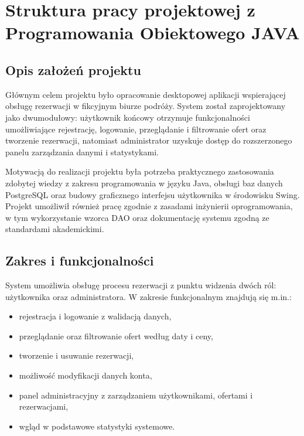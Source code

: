 \chapter{Struktura pracy projektowej z Programowania Obiektowego JAVA}
\label{cha:elementyPracyproj}




\section{Opis założeń projektu}

Głównym celem projektu było opracowanie desktopowej aplikacji wspierającej obsługę rezerwacji w fikcyjnym biurze podróży. System został zaprojektowany jako dwumodułowy: użytkownik końcowy otrzymuje funkcjonalności umożliwiające rejestrację, logowanie, przeglądanie i filtrowanie ofert oraz tworzenie rezerwacji, natomiast administrator uzyskuje dostęp do rozszerzonego panelu zarządzania danymi i statystykami.

Motywacją do realizacji projektu była potrzeba praktycznego zastosowania zdobytej wiedzy z zakresu programowania w języku Java, obsługi baz danych PostgreSQL oraz budowy graficznego interfejsu użytkownika w środowisku Swing. Projekt umożliwił również pracę zgodnie z zasadami inżynierii oprogramowania, w tym wykorzystanie wzorca DAO oraz dokumentację systemu zgodną ze standardami akademickimi.


\section{Zakres i funkcjonalności}

System umożliwia obsługę procesu rezerwacji z punktu widzenia dwóch ról: użytkownika oraz administratora. W zakresie funkcjonalnym znajdują się m.in.:

\begin{itemize}
    \item rejestracja i logowanie z walidacją danych,
    \item przeglądanie oraz filtrowanie ofert według daty i ceny,
    \item tworzenie i usuwanie rezerwacji,
    \item możliwość modyfikacji danych konta,
    \item panel administracyjny z zarządzaniem użytkownikami, ofertami i rezerwacjami,
    \item wgląd w podstawowe statystyki systemowe.
\end{itemize}

